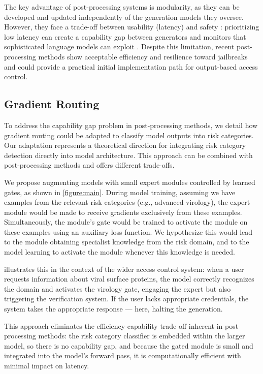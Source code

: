 \documentclass{article}
\theoremstyle{plain}
\theoremstyle{definition}
\theoremstyle{remark}
\begin{document}
The key advantage of post-processing systems is modularity, as they
can be developed and updated independently of the generation models
they oversee.
However, they face a trade-off between usability (latency) and safety
\cite{kumar2025freelunchguardrails}: prioritizing low latency can
create a capability gap between generators and monitors that
sophisticated language models can exploit
\cite{jin2024jailbreakinglargelanguagemodels}.
Despite this limitation, recent post-processing methods show
acceptable efficiency and resilience toward jailbreaks
\cite{sharma2025constitutionalclassifiersdefendinguniversal} and
could provide a practical initial implementation path for
output-based access control.

\subsection{Gradient Routing} \label{section:gradient-routing}

To address the capability gap problem in post-processing methods, we
detail how gradient routing \cite{cloud2024gradientroutingmaskinggradients}
could be adapted to classify model outputs into risk categories.
Our adaptation represents a theoretical direction for integrating
risk category detection directly into model architecture.
This approach can be combined with post-processing methods and offers
different trade-offs.

We propose augmenting models with small expert modules controlled by
learned gates, as shown in \cref{figure:main}.
During model training, assuming we have examples from the relevant
risk categories (e.g., advanced virology), the expert module would be
made to receive gradients exclusively from these examples.
Simultaneously, the module's gate would be trained to activate the
module on these examples using an auxiliary loss function.
We hypothesize this would lead to the module obtaining specialist
knowledge from the risk domain, and to the model learning to activate
the module whenever this knowledge is needed.

 illustrates this in the context of the wider
access control system: when a user requests information about viral
surface proteins, the model correctly recognizes the domain and
activates the virology gate, engaging the expert but also triggering
the verification system. If the user lacks appropriate credentials,
the system takes the appropriate response --- here, halting the generation.

This approach eliminates the efficiency-capability
trade-off inherent in post-processing methods: the risk category
classifier is embedded within the larger model, so there is no
capability gap, and because the gated module is small and integrated
into the model's forward pass, it is computationally efficient with
minimal impact on latency.
\end{document}
